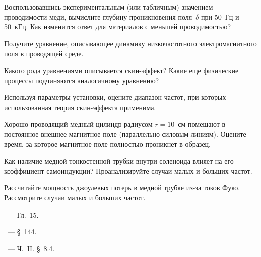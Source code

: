 \begin{lab:questions}
\item Воспользовавшись экспериментальным (или табличным) значением
проводимости меди, вычислите глубину проникновения поля~$\delta$
при 50~Гц и 50~кГц. Как изменится ответ для материалов с меньшей
проводимостью?

\item Получите уравнение, описывающее динамику низкочастотного электромагнитного
поля в проводящей среде.

\item Какого рода уравнениями описывается скин-эффект? Какие еще физические
процессы подчиняются аналогичному уравнению?

\item Используя параметры установки, оцените диапазон частот,
при которых использованная теория скин-эффекта применима.

\item Хорошо проводящий медный цилиндр радиусом $r=10$~см помещают в постоянное внешнее магнитное поле
(параллельно силовым линиям). Оцените время, за которое магнитное поле полностью проникнет в образец.

\item Как наличие медной тонкостенной трубки внутри соленоида влияет
на его коэффициент самоиндукции?
Проанализируйте случаи малых и больших частот.

\item Рассчитайте мощность джоулевых потерь в медной трубке из-за токов Фуко.
Рассмотрите случаи малых и больших частот.
%

%
%

\end{lab:questions}


\begin{lab:literature}
\item \Kirichenko~--- Гл.~15.

\item \SivuhinIII~--- \S~144.

\item \KingLokOlh~--- Ч.~II. \S~8.4.
\end{lab:literature}
